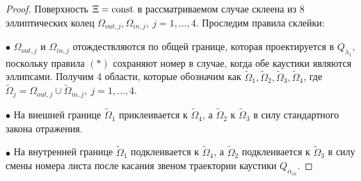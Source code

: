 \begin{proof}
Поверхность $\Xi=\mathrm{const}$ в рассматриваемом случае склеена из 8 эллиптических колец $\Omega_{out, j}, \Omega_{in, j}, \ j=1, \ldots, 4$. 
Проследим правила склейки:

$\bullet$ $\Omega_{out, j}$ и $\Omega_{in, j}$ отождествляются по общей границе, которая проектируется в $Q_{\lambda_1}$, поскольку правила $(\ast)$ сохраняют номер в случае, когда обе каустики являются эллипсами.
Получим 4 области, которые обозначим как $\widetilde{\Omega}_1, \widetilde{\Omega}_2, \widetilde{\Omega}_3, \widetilde{\Omega}_4$, где $\widetilde{\Omega}_j = \Omega_{out, j} \cup \widetilde{\Omega}_{in, j}, \ j=1, \ldots, 4$.

$\bullet$ На внешней границе $\widetilde{\Omega}_1$ приклеивается к $\widetilde{\Omega}_4$, а $\widetilde{\Omega}_2$ к $\widetilde{\Omega}_3$ в силу стандартного закона отражения.

$\bullet$ На внутренней границе $\widetilde{\Omega}_1$ подклеивается к $\widetilde{\Omega}_4$, а $\widetilde{\Omega}_2$ подклеивается к $\widetilde{\Omega}_3$ в силу смены номера листа после касания звеном траектории каустики $Q_{\alpha_{in}}$.


\end{proof}
